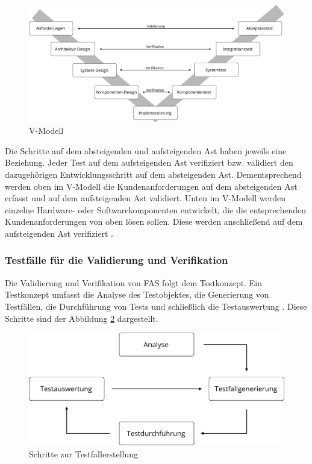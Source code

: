 \begin{figure}[h]
\centering
\includegraphics[scale=0.5]{images/v_modell.pdf}
\caption{V-Modell \cite{hakuli2015virtuelle}}
\label{fig_v_modell}
\end{figure}

Die Schritte auf dem absteigenden und aufsteigenden Ast haben jeweils eine Beziehung. Jeder Test auf dem aufsteigenden Ast verifiziert bzw. validiert den dazugehörigen Entwicklungsschritt auf dem absteigenden Ast. Dementsprechend werden oben im V-Modell die Kundenanforderungen auf dem absteigenden Ast erfasst und auf dem aufsteigenden Ast validiert. Unten im V-Modell werden einzelne Hardware- oder Softwarekomponenten entwickelt, die die entsprechenden Kundenanforderungen von oben lösen sollen. Diese werden anschließend auf dem aufsteigenden Ast verifiziert \cite{hakuli2015virtuelle}.

\subsubsection{Testfälle für die Validierung und Verifikation}

Die Validierung und Verifikation von \ac{FAS} folgt dem Testkonzept. Ein Testkonzept umfasst die Analyse des Testobjektes, die Generierung von Testfällen, die Durchführung von Tests und schließlich die Testauswertung \cite{schuldt2013effiziente}. Diese Schritte sind der Abbildung \ref{fig_testfallerstellung} dargestellt.

\begin{figure}[h]
\centering
\includegraphics[scale=0.7]{images/testfallerstellung.pdf}
\caption{Schritte zur Testfallerstellung \cite{schuldt2013effiziente}}
\label{fig_testfallerstellung}
\end{figure}

